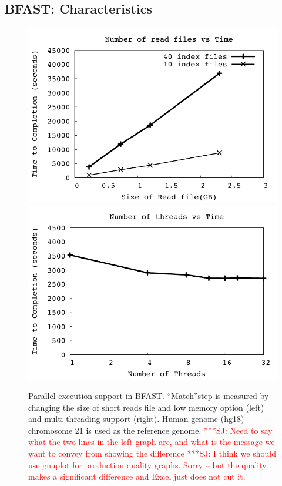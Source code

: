 \documentclass[12pt]{article}
\newcommand{\jhanote}[1]{ {\textcolor{red}     {***SJ: #1}}}
\newcommand{\jhanote}[1]{}
\begin{document}


\subsection{BFAST: Characteristics}

\begin{figure}
 \centering
\includegraphics[scale=0.66]{figures/readsvstime.pdf}
\includegraphics[scale=0.66]{figures/threadsvstime.pdf} 

\caption{\small Parallel execution support in BFAST.  ``Match''step is measured by changing the size of short reads file and low memory option (left) and multi-threading support (right).  Human genome (hg18) chromosome 21 is used as the reference genome. \jhanote{Need to say what the two lines in the left graph are, and what is the message we want to convey from showing the difference} \jhanote{I think we should use gnuplot for production quality graphs. Sorry -- but the quality makes a significant difference and Excel just does not cut it.}}
  \label{fig:parallel-execution} 
 \end{figure}
\end{document}
